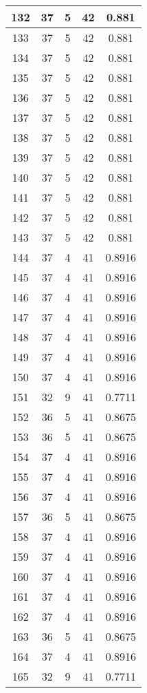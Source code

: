 \documentclass[letterpaper, 12pt]{article}
\begin{document}
\begin{longtable}{|c|c|c|c|c|}
\hline
132 & 37 & 5 & 42 & 0.881 \\
\hline
133 & 37 & 5 & 42 & 0.881 \\
\hline
134 & 37 & 5 & 42 & 0.881 \\
\hline
135 & 37 & 5 & 42 & 0.881 \\
\hline
136 & 37 & 5 & 42 & 0.881 \\
\hline
137 & 37 & 5 & 42 & 0.881 \\
\hline
138 & 37 & 5 & 42 & 0.881 \\
\hline
139 & 37 & 5 & 42 & 0.881 \\
\hline
140 & 37 & 5 & 42 & 0.881 \\
\hline
141 & 37 & 5 & 42 & 0.881 \\
\hline
142 & 37 & 5 & 42 & 0.881 \\
\hline
143 & 37 & 5 & 42 & 0.881 \\
\hline
144 & 37 & 4 & 41 & 0.8916 \\
\hline
145 & 37 & 4 & 41 & 0.8916 \\
\hline
146 & 37 & 4 & 41 & 0.8916 \\
\hline
147 & 37 & 4 & 41 & 0.8916 \\
\hline
148 & 37 & 4 & 41 & 0.8916 \\
\hline
149 & 37 & 4 & 41 & 0.8916 \\
\hline
150 & 37 & 4 & 41 & 0.8916 \\
\hline
151 & 32 & 9 & 41 & 0.7711 \\
\hline
152 & 36 & 5 & 41 & 0.8675 \\
\hline
153 & 36 & 5 & 41 & 0.8675 \\
\hline
154 & 37 & 4 & 41 & 0.8916 \\
\hline
155 & 37 & 4 & 41 & 0.8916 \\
\hline
156 & 37 & 4 & 41 & 0.8916 \\
\hline
157 & 36 & 5 & 41 & 0.8675 \\
\hline
158 & 37 & 4 & 41 & 0.8916 \\
\hline
159 & 37 & 4 & 41 & 0.8916 \\
\hline
160 & 37 & 4 & 41 & 0.8916 \\
\hline
161 & 37 & 4 & 41 & 0.8916 \\
\hline
162 & 37 & 4 & 41 & 0.8916 \\
\hline
163 & 36 & 5 & 41 & 0.8675 \\
\hline
164 & 37 & 4 & 41 & 0.8916 \\
\hline
165 & 32 & 9 & 41 & 0.7711 \\

\end{longtable}
\end{document}
